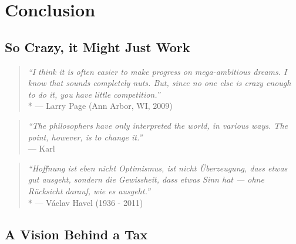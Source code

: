 
\chapter{Conclusion} \label{chap:conclusion-phd} 


\section{So Crazy, it Might Just Work}

\begin{quote}
	\emph{``I think it is often easier to make progress on mega-ambitious dreams. 
	I know that sounds completely nuts. 
	But, since no one else is crazy enough to do it, you have little competition.''}\\*
	--- Larry Page (Ann Arbor, WI, 2009)
\end{quote}

\begin{quote}
	\emph{``The philosophers have only interpreted the world, in various ways. The point, however, is to change it.''}\\
	--- Karl \cite{Marx1844} %
\end{quote}


\begin{quote}
	\emph{``Hoffnung ist eben nicht Optimismus, ist nicht Überzeugung, dass etwas gut ausgeht, sondern die Gewissheit, dass etwas Sinn hat --- ohne Rücksicht darauf, wie es ausgeht.''}\\*
	--- V\'{a}clav Havel (1936 - 2011)
\end{quote}







\section{A Vision Behind a Tax}


